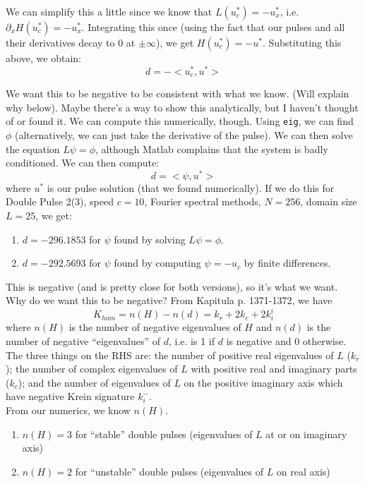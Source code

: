 \documentclass[12pt]{article}
\begin{document}
We can simplify this a little since we know that $L(u^*_c) = -u^*_x$, i.e. $\partial_x H(u^*_c) = -u^*_x$. Integrating this once (using the fact that our pulses and all their derivatives decay to 0 at $\pm \infty$), we get $H(u^*_c) = -u^*$. Substituting this above, we obtain:
\[
d = -<u^*_c, u^*>
\]

We want this to be negative to be consistent with what we know. (Will explain why below). Maybe there's a way to show this analytically, but I haven't thought of or found it. We can compute this numerically, though. Using \texttt{eig}, we can find $\phi$ (alternatively, we can just take the derivative of the pulse). We can then solve the equation $L \psi = \phi$, although Matlab complains that the system is badly conditioned. We can then compute:
\[
d = <\psi, u^*>
\]
where $u^*$ is our pulse solution (that we found numerically). If we do this for Double Pulse 2(3), speed $c = 10$, Fourier spectral methods, $N = 256$, domain size $L = 25$, we get:

\begin{enumerate}
	\item $d = -296.1853$ for $\psi$ found by solving $L \psi = \phi$.
	\item $d = -292.5693$ for $\psi$ found by computing $\psi = -u_c$ by finite differences.
\end{enumerate}

This is negative (and is pretty close for both versions), so it's what we want.\\

Why do we want this to be negative? From Kapitula p. 1371-1372, we have
\begin{equation}
K_{ham} = n(H) - n(d) = k_r + 2 k_c + 2 k_i^i
\end{equation}
where $n(H)$ is the number of negative eigenvalues of $H$ and $n(d)$ is the number of negative ``eigenvalues'' of $d$, i.e. is 1 if $d$ is negative and 0 otherwise. The three things on the RHS are: the number of positive real eigenvalues of $L$ ($k_r$); the number of complex eigenvalues of $L$ with positive real and imaginary parts ($k_c$); and the number of eigenvalues of $L$ on the positive imaginary axis which have negative Krein signature $k_i^-$. \\

From our numerics, we know $n(H)$.
\begin{enumerate}
	\item $n(H) = 3$ for ``stable'' double pulses (eigenvalues of $L$ at or on imaginary axis)
	\item $n(H) = 2$ for ``unstable'' double pulses (eigenvalues of $L$ on real axis)
\end{enumerate}
\end{document}
